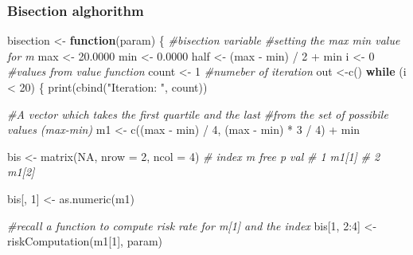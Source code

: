 \documentclass[
]{article}
\newenvironment{Shaded}{\begin{snugshade}}{\end{snugshade}}
\newcommand{\AttributeTok}[1]{\textcolor[rgb]{0.77,0.63,0.00}{#1}}
\newcommand{\CommentTok}[1]{\textcolor[rgb]{0.56,0.35,0.01}{\textit{#1}}}
\newcommand{\ConstantTok}[1]{\textcolor[rgb]{0.00,0.00,0.00}{#1}}
\newcommand{\ControlFlowTok}[1]{\textcolor[rgb]{0.13,0.29,0.53}{\textbf{#1}}}
\newcommand{\DecValTok}[1]{\textcolor[rgb]{0.00,0.00,0.81}{#1}}
\newcommand{\FloatTok}[1]{\textcolor[rgb]{0.00,0.00,0.81}{#1}}
\newcommand{\FunctionTok}[1]{\textcolor[rgb]{0.00,0.00,0.00}{#1}}
\newcommand{\NormalTok}[1]{#1}
\newcommand{\OtherTok}[1]{\textcolor[rgb]{0.56,0.35,0.01}{#1}}
\newcommand{\SpecialCharTok}[1]{\textcolor[rgb]{0.00,0.00,0.00}{#1}}
\newcommand{\StringTok}[1]{\textcolor[rgb]{0.31,0.60,0.02}{#1}}
\begin{document}
\hypertarget{bisection-alghorithm}{%
\subsubsection{Bisection alghorithm}\label{bisection-alghorithm}}

\begin{Shaded}
\begin{Highlighting}[]
\NormalTok{bisection }\OtherTok{\textless{}{-}} \ControlFlowTok{function}\NormalTok{(param) \{}
    \CommentTok{\#bisection variable}
    \CommentTok{\#setting the max min value for m}
\NormalTok{    max     }\OtherTok{\textless{}{-}} \FloatTok{20.0000}
\NormalTok{    min     }\OtherTok{\textless{}{-}} \FloatTok{0.0000}
\NormalTok{    half    }\OtherTok{\textless{}{-}}\NormalTok{ (max }\SpecialCharTok{{-}}\NormalTok{ min) }\SpecialCharTok{/} \DecValTok{2} \SpecialCharTok{+}\NormalTok{ min}
\NormalTok{    i       }\OtherTok{\textless{}{-}} \DecValTok{0} \CommentTok{\#values from value function}
\NormalTok{    count   }\OtherTok{\textless{}{-}} \DecValTok{1} \CommentTok{\#numeber of iteration}
\NormalTok{    out }\OtherTok{\textless{}{-}}\FunctionTok{c}\NormalTok{()}
    \ControlFlowTok{while}\NormalTok{ (i }\SpecialCharTok{\textless{}} \DecValTok{20}\NormalTok{) \{}
      \FunctionTok{print}\NormalTok{(}\FunctionTok{cbind}\NormalTok{(}\StringTok{"Iteration: "}\NormalTok{, count))}

      \CommentTok{\#A vector which takes the first quartile and the last}
      \CommentTok{\#from the set of possibile values (max{-}min)}
\NormalTok{      m1  }\OtherTok{\textless{}{-}} \FunctionTok{c}\NormalTok{((max }\SpecialCharTok{{-}}\NormalTok{ min) }\SpecialCharTok{/} \DecValTok{4}\NormalTok{, (max }\SpecialCharTok{{-}}\NormalTok{ min) }\SpecialCharTok{*} \DecValTok{3} \SpecialCharTok{/} \DecValTok{4}\NormalTok{) }\SpecialCharTok{+}\NormalTok{ min}

\NormalTok{      bis }\OtherTok{\textless{}{-}} \FunctionTok{matrix}\NormalTok{(}\ConstantTok{NA}\NormalTok{, }\AttributeTok{nrow =} \DecValTok{2}\NormalTok{, }\AttributeTok{ncol =} \DecValTok{4}\NormalTok{)}
      \CommentTok{\#   index    m     free    p   val}
      \CommentTok{\#   1       m1[1]}
      \CommentTok{\#   2       m1[2]}

\NormalTok{      bis[, }\DecValTok{1}\NormalTok{] }\OtherTok{\textless{}{-}} \FunctionTok{as.numeric}\NormalTok{(m1)}

      \CommentTok{\#recall a function to compute risk rate for m[1] and the index}
\NormalTok{      bis[}\DecValTok{1}\NormalTok{, }\DecValTok{2}\SpecialCharTok{:}\DecValTok{4}\NormalTok{] }\OtherTok{\textless{}{-}} \FunctionTok{riskComputation}\NormalTok{(m1[}\DecValTok{1}\NormalTok{], param)}


\end{Highlighting}
\end{Shaded}
\end{document}
